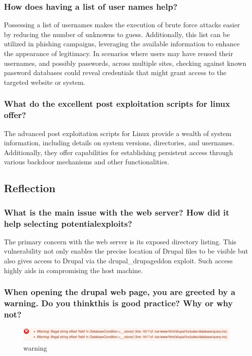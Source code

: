 \subsubsection{How does having a list of user names help?}
Possessing a list of usernames makes the execution of brute force attacks easier by reducing the number of unknowns to guess.
Additionally, this list can be utilized in phishing campaigns, leveraging the available information to enhance the appearance of legitimacy.
In scenarios where users may have reused their usernames, and possibly passwords, across multiple sites,
checking against known password databases could reveal credentials that might grant access to the targeted website or system.


\subsubsection{What do the excellent post exploitation scripts for linux offer?}
The advanced post exploitation scripts for Linux provide a wealth of system information, including details on system versions, directories, and usernames.
Additionally, they offer capabilities for establishing persistent access through various backdoor mechanisms and other functionalities.


\subsection{Reflection}

\subsubsection{What is the main issue with the web server? How did it help selecting potentialexploits?}
The primary concern with the web server is its exposed directory listing.
This vulnerability not only enables the precise location of Drupal files to be visible but also gives access to Drupal via the drupal\_drupageddon exploit.
Such access highly aids in compromising the host machine.

\subsubsection{When opening the drupal web page, you are greeted by a warning. Do you thinkthis is good practice? Why or why not?}

\begin{figure}[H]
    \centering
    \includegraphics[width=0.9\linewidth]{pic/warning.png}
    \caption{warning}
    \label{fig:warning}
\end{figure}

